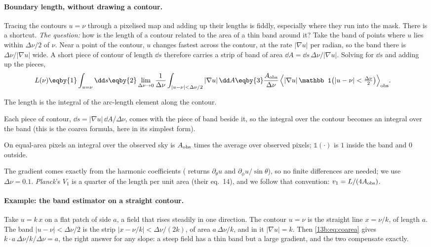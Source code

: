\paragraph{Boundary length, without drawing a contour.} Tracing the contours $u=\nu$ through a pixelised map and
adding up their lengths is fiddly, especially where they run into the mask. There is a shortcut. \emph{The
question:} how is the length of a contour related to the area of a thin band around it? Take the band of points
where $u$ lies within $\Delta\nu/2$ of $\nu$. Near a point of the contour, $u$ changes fastest across the contour,
at the rate $|\nabla u|$ per radian, so the band there is $\Delta\nu/|\nabla u|$ wide. A short piece of contour of
length $\dd s$ therefore carries a strip of band of area $\dd A=\dd s\,\Delta\nu/|\nabla u|$. Solving for $\dd s$
and adding up the pieces,
\begin{align}
  L(\nu)
  &\eqby{1}\int_{u=\nu}\dd s
   \eqby{2}\lim_{\Delta\nu\to0}\frac{1}{\Delta\nu}\int_{|u-\nu|<\Delta\nu/2}|\nabla u|\,\dd A
   \eqby{3}\frac{A_{\rm obs}}{\Delta\nu}\,\Bigl\langle|\nabla u|\,\mathbb 1\bigl(|u-\nu|<\tfrac{\Delta\nu}{2}\bigr)\Bigr\rangle_{\rm obs}.
  \label{13b:eq:coarea}
\end{align}
\begin{explain}
  \item The length is the integral of the arc-length element along the contour.
  \item Each piece of contour, $\dd s=|\nabla u|\,\dd A/\Delta\nu$, comes with the piece of band beside it, so
        the integral over the contour becomes an integral over the band (this is the coarea formula, here in its
        simplest form).
  \item On equal-area pixels an integral over the observed sky is $A_{\rm obs}$ times the average over observed
        pixels; $\mathbb 1(\cdot)$ is $1$ inside the band and $0$ outside.
\end{explain}
The gradient comes exactly from the harmonic coefficients ( returns
$\partial_\theta u$ and $\partial_\phi u/\sin\theta$), so no finite differences are needed; we use
$\Delta\nu=0.1$. \textit{Planck}'s $V_1$ is a quarter of the length per unit area (their eq.~14), and we follow that
convention: $v_1=L/(4A_{\rm obs})$.

\paragraph{Example: the band estimator on a straight contour.} Take $u=k\,x$ on a flat patch of side $a$, a field
that rises steadily in one direction. The contour $u=\nu$ is the straight line $x=\nu/k$, of length $a$. The band
$|u-\nu|<\Delta\nu/2$ is the strip $|x-\nu/k|<\Delta\nu/(2k)$, of area $a\,\Delta\nu/k$, and in it $|\nabla u|=k$.
Then \eqref{13b:eq:coarea} gives $k\cdot a\,\Delta\nu/k/\Delta\nu=a$, the right answer for any slope: a steep field
has a thin band but a large gradient, and the two compensate exactly.

